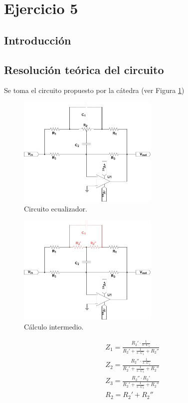 \section{Ejercicio 5}
\subsection{Introducción}



\subsection{Resolución teórica del circuito}
Se toma el circuito propuesto por la cátedra (ver Figura \ref{fig:EQ_module})
\begin{figure}[H]
    \centering
    \includegraphics[width=0.6\textwidth]{../EJ5/latex_resources/EQ_module}
    \caption{Circuito ecualizador.}
    \label{fig:EQ_module}
\end{figure}

\begin{figure}[H]
    \centering
    \includegraphics[width=0.6\textwidth]{../EJ5/latex_resources/Z1_2_and_3}
    \caption{Cálculo intermedio.}
    \label{fig:Z123}
\end{figure}

\begin{align}
    &Z_1 = \frac{R_2' \cdot \frac{1}{s \cdot C_1}}{R_2' + \frac{1}{s \cdot C_1} + R_2''}  \label{eq:ej5_z1} \\
    &Z_2 = \frac{R_2'' \cdot \frac{1}{s \cdot C_1}}{R_2' + \frac{1}{s \cdot C_1} + R_2''}  \label{eq:ej5_z2} \\
    &Z_3 = \frac{R_2'' \cdot R_2'}{R_2' + \frac{1}{s \cdot C_1} + R_2''}  \label{eq:ej5_z3} \\
    &R_2 = R_2' + R_2'' \label{eq:ej5_r2}
\end{align}

